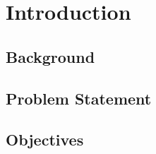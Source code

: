 \newpage
\section{Introduction}
\label{sec:introduction}

\subsection{Background}
\label{subsec:background}

\subsection{Problem Statement}
\label{subsec:problem-statement}

\subsection{Objectives}
\label{subsec:objectives}